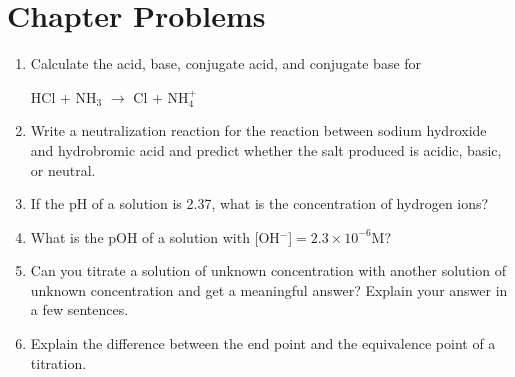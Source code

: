 \documentclass[../hchem.tex]{subfiles}
\begin{document}
\section*{Chapter Problems}
\begin{enumerate}
    \item Calculate the acid, base, conjugate acid, and conjugate base for 
    \begin{center}
        HCl + NH$_3$ $\rightarrow$ Cl + NH$_4^+$
    \end{center}
    \item Write a neutralization reaction for the reaction between sodium hydroxide and hydrobromic acid and predict whether the salt produced is acidic, basic, or neutral.
    \item If the pH of a solution is 2.37, what is the concentration of hydrogen ions?
    \item What is the pOH of a solution with [OH$^-$]$=2.3\times 10^{-6}$M?
    \item Can you titrate a solution of unknown concentration with another solution of unknown concentration and get a meaningful answer? Explain your answer in a few sentences.
    \item Explain the difference between the end point and the equivalence point of a titration.
\end{enumerate}
\end{document}
